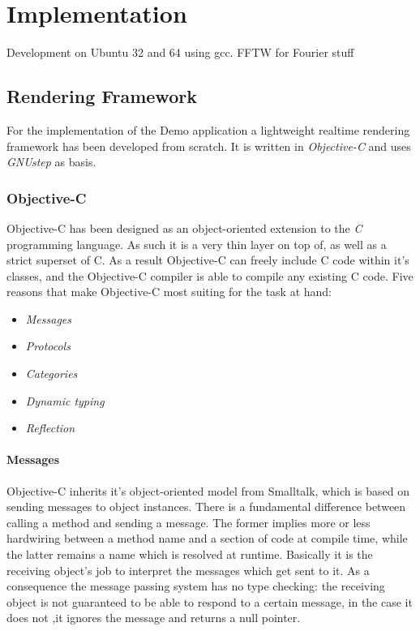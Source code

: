 \chapter{Implementation}

Development on Ubuntu 32 and 64 using gcc.
FFTW for Fourier stuff

\section{Rendering Framework}

For the implementation of the Demo application a lightweight realtime
rendering framework has been developed from scratch. It is written in
\textit{Objective-C} and uses \textit{GNUstep} as basis.

\subsection{Objective-C}

Objective-C has been designed as an object-oriented extension to the
\textit{C} programming language. As such it is a very thin layer on top of, as
well as a strict superset of C. As a result Objective-C can freely include C
code within it's classes, and the Objective-C compiler is able to compile any
existing C code. Five reasons that make Objective-C most suiting for the task
at hand:

\begin{itemize}
 \item \textit{Messages}
 \item \textit{Protocols}
 \item \textit{Categories}
 \item \textit{Dynamic typing}
 \item \textit{Reflection}
\end{itemize}

\subsubsection{Messages}
Objective-C inherits it's object-oriented model from Smalltalk, which is based
on sending messages to object instances. There is a fundamental difference
between calling a method and sending a message. The former implies more or less
hardwiring between a method name and a section of code at compile time, while
the latter remains a name which is resolved at runtime. Basically it is the
receiving object's job to interpret the messages which get sent to it. As a
consequence the message passing system has no type checking: the receiving
object is not guaranteed to be able to respond to a certain message, in the
case it does not ,it ignores the message and returns a null pointer.

